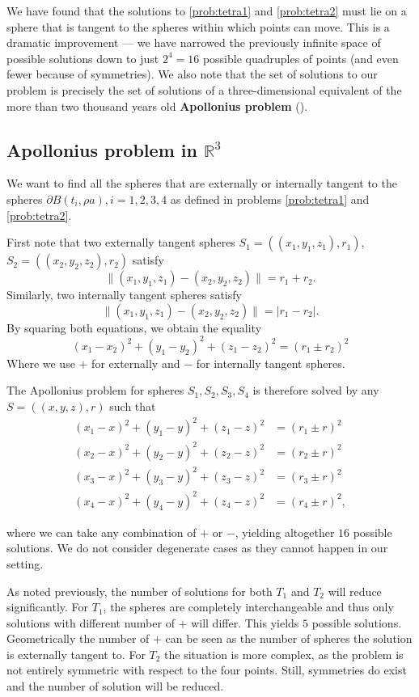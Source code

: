 We have found that the solutions to \ref{prob:tetra1} and \ref{prob:tetra2} must lie on a sphere that is tangent to the spheres within which points can move. This is a dramatic improvement --- we have narrowed the previously infinite space of possible solutions down to just $2^4=16$ possible quadruples of points (and even fewer because of symmetries). We also note that the set of solutions to our problem is precisely the set of solutions of a three-dimensional equivalent of the more than two thousand years old \textbf{Apollonius problem} (\cite{GischRibando2006}).


\subsection{Apollonius problem in $\mathbb R^3$}
We want to find all the spheres that are externally or internally tangent to the spheres $\partial B(t_i,\rho a), i=1,2,3,4$ as defined in problems \ref{prob:tetra1} and \ref{prob:tetra2}.

First note that two externally tangent spheres $S_1=((x_1,y_1,z_1),r_1)$, $S_2=((x_2,y_2,z_2),r_2)$  satisfy
$$\|(x_1,y_1,z_1) - (x_2,y_2,z_2)\| = r_1+r_2.$$
Similarly, two internally tangent spheres satisfy
$$\|(x_1,y_1,z_1) - (x_2,y_2,z_2)\| = |r_1 - r_2|.$$
By squaring both equations, we obtain the equality
$$(x_1-x_2)^2 + (y_1-y_2)^2 + (z_1-z_2)^2 = (r_1 \pm r_2)^2$$
Where we use $+$ for externally and $-$ for internally tangent spheres.

The Apollonius problem for spheres $S_1,S_2,S_3,S_4$ is therefore solved by any $S=((x,y,z),r)$ such that
\begin{align}\label{eq:Apollonius}
  (x_1-x)^2 + (y_1-y)^2 + (z_1-z)^2 &= (r_1 \pm r)^2 \\
  (x_2-x)^2 + (y_2-y)^2 + (z_2-z)^2 &= (r_2 \pm r)^2 \nonumber \\
  (x_3-x)^2 + (y_3-y)^2 + (z_3-z)^2 &= (r_3 \pm r)^2 \nonumber \\
  (x_4-x)^2 + (y_4-y)^2 + (z_4-z)^2 &= (r_4 \pm r)^2, \nonumber  
\end{align}

where we can take any combination of $+$ or $-$, yielding altogether $16$ possible solutions. We do not consider degenerate cases as they cannot happen in our setting. 

As noted previously, the number of solutions for both $T_1$ and $T_2$ will reduce significantly. For $T_1$, the spheres are completely interchangeable and thus only solutions with different number of $+$ will differ. This yields $5$ possible solutions. Geometrically the number of $+$ can be seen as the number of spheres the solution is externally tangent to. For $T_2$ the situation is more complex, as the problem is not entirely symmetric with respect to the four points. Still, symmetries do exist and the number of solution will be reduced.  

